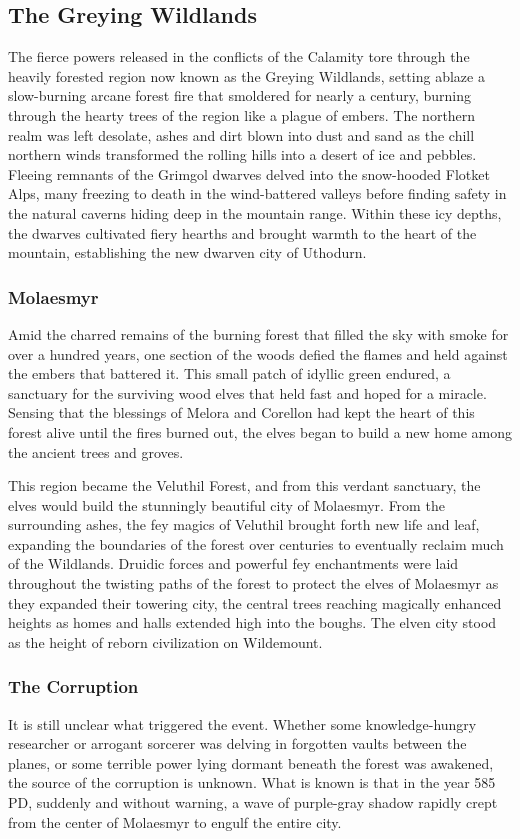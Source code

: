 \documentclass[10pt,a4paper,twoside,bg=print,twocolumn,openany,nodeprecatedcode]{dndbook}
\begin{document}
\subsection{The Greying Wildlands}
The fierce powers released in the conflicts of the Calamity tore through the heavily forested region now known as the Greying Wildlands, setting ablaze a slow-burning arcane forest fire that smoldered for nearly a century, burning through the hearty trees of the region like a plague of embers. The northern realm was left desolate, ashes and dirt blown into dust and sand as the chill northern winds transformed the rolling hills into a desert of ice and pebbles. Fleeing remnants of the Grimgol dwarves delved into the snow-hooded Flotket Alps, many freezing to death in the wind-battered valleys before finding safety in the natural caverns hiding deep in the mountain range. Within these icy depths, the dwarves cultivated fiery hearths and brought warmth to the heart of the mountain, establishing the new dwarven city of Uthodurn.

\subsubsection{Molaesmyr}
Amid the charred remains of the burning forest that filled the sky with smoke for over a hundred years, one section of the woods defied the flames and held against the embers that battered it. This small patch of idyllic green endured, a sanctuary for the surviving wood elves that held fast and hoped for a miracle. Sensing that the blessings of Melora and Corellon had kept the heart of this forest alive until the fires burned out, the elves began to build a new home among the ancient trees and groves.

This region became the Veluthil Forest, and from this verdant sanctuary, the elves would build the stunningly beautiful city of Molaesmyr. From the surrounding ashes, the fey magics of Veluthil brought forth new life and leaf, expanding the boundaries of the forest over centuries to eventually reclaim much of the Wildlands. Druidic forces and powerful fey enchantments were laid throughout the twisting paths of the forest to protect the elves of Molaesmyr as they expanded their towering city, the central trees reaching magically enhanced heights as homes and halls extended high into the boughs. The elven city stood as the height of reborn civilization on Wildemount.

\subsubsection{The Corruption}
It is still unclear what triggered the event. Whether some knowledge-hungry researcher or arrogant sorcerer was delving in forgotten vaults between the planes, or some terrible power lying dormant beneath the forest was awakened, the source of the corruption is unknown. What is known is that in the year 585 PD, suddenly and without warning, a wave of purple-gray shadow rapidly crept from the center of Molaesmyr to engulf the entire city.
\end{document}
